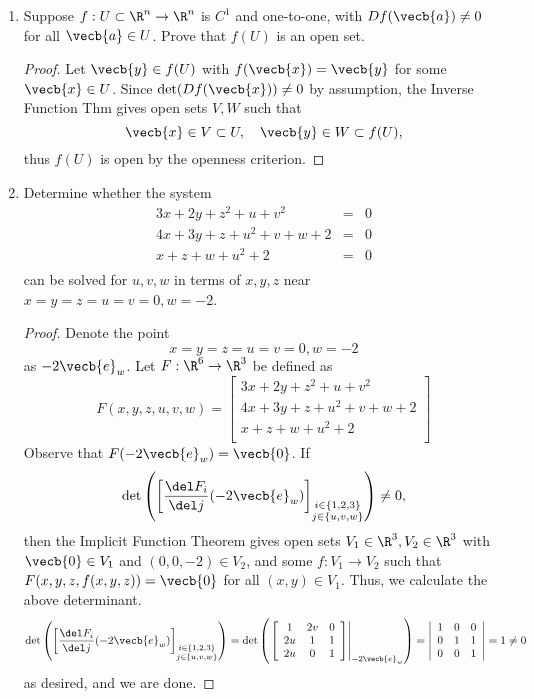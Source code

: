 \documentclass[letterpaper]{article}
\begin{document}
\begin{enumerate}
\item Suppose $f:U\subset \R^n\to \R^n$ is $C^1$ and one-to-one, with $Df(\vecb{a})\neq0$ for all $\vecb{a}\in U$. Prove that $f(U)$ is an open set. 
\begin{proof}
Let $\vecb{y}\in f(U)$ with $f(\vecb{x})=\vecb{y}$ for some $\vecb{x}\in U$. Since $\det(Df(\vecb{x}))\neq0$ by assumption, the Inverse Function Thm gives open sets $V, W$ such that 
$$\vecb{x}\in V \subset U, \quad \vecb{y}\in W \subset f(U),$$
thus $f(U)$ is open by the openness criterion. 
\end{proof}

\item Determine whether the system 
\[\begin{array}{rcl}
3x+2y+z^2+u+v^2 &=& 0\\
4x+3y+z+u^2+v+w+2 &=& 0\\
x+z+w+u^2+2 &=& 0\\
\end{array}\]
can be solved for $u,v,w$ in terms of $x,y,z$ near $x=y=z=u=v=0, w=-2$.
\begin{proof}
Denote the point $$x=y=z=u=v=0, w=-2$$ as $-2\vecb{e}_w$. Let $F:\R^6\to\R^3$ be defined as 
\[
F(x,y,z,u,v,w)=\left[
\begin{array}{c}
3x+2y+z^2+u+v^2\\
4x+3y+z+u^2+v+w+2\\
x+z+w+u^2+2\\
\end{array}\right]
\]
Observe that $F(-2\vecb{e}_w)=\vecb{0}$. If 
$$\det\left(\left[\frac{\del F_i}{\del j}(-2\vecb{e}_w)\right]_{\substack{i\in\{1,2,3\}\\j\in\{u,v,w\}}}\right)\neq0,$$
then the Implicit Function Theorem gives open sets $V_1\in \R^3, V_2\in \R^3$ with $\vecb{0}\in V_1$ and $(0,0,-2)\in V_2$, and some $f:V_1\to V_2$ such that $F(x,y,z,f(x,y,z))=\vecb{0}$ for all $(x,y)\in V_1$. Thus, we calculate the above determinant. 
\[
\det\left(\left[\frac{\del F_i}{\del j}(-2\vecb{e}_w)\right]_{\substack{i\in\{1,2,3\}\\j\in\{u,v,w\}}}\right)
=
\det\left(\left.\left[
\begin{array}{ccc}
1 & 2v & 0 \\
2u & 1 & 1 \\
2u & 0 & 1 \\
\end{array}
\right]\right|_{-2\vecb{e}_w}\right)
=
\left|\begin{array}{ccc}
1 & 0 & 0 \\
0 & 1 & 1 \\
0 & 0 & 1 \\
\end{array}\right|
=
1\neq0
\]
as desired, and we are done.
\end{proof}


\end{enumerate}
\end{document}
